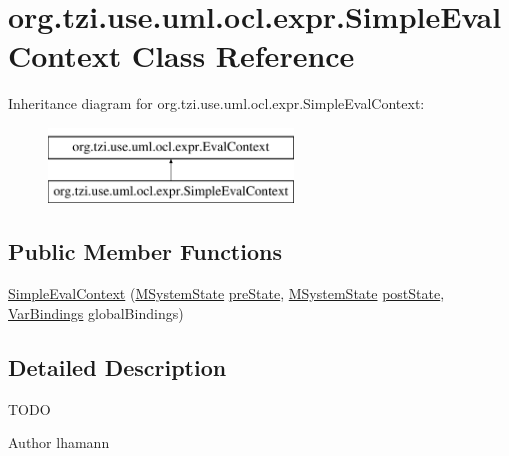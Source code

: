 \hypertarget{classorg_1_1tzi_1_1use_1_1uml_1_1ocl_1_1expr_1_1_simple_eval_context}{\section{org.\-tzi.\-use.\-uml.\-ocl.\-expr.\-Simple\-Eval\-Context Class Reference}
\label{classorg_1_1tzi_1_1use_1_1uml_1_1ocl_1_1expr_1_1_simple_eval_context}
}
Inheritance diagram for org.\-tzi.\-use.\-uml.\-ocl.\-expr.\-Simple\-Eval\-Context\-:\begin{figure}[H]
\begin{center}
\leavevmode
\includegraphics[height=2.000000cm]{classorg_1_1tzi_1_1use_1_1uml_1_1ocl_1_1expr_1_1_simple_eval_context}
\end{center}
\end{figure}
\subsection*{Public Member Functions}
\begin{DoxyCompactItemize}
\item 
\hyperlink{classorg_1_1tzi_1_1use_1_1uml_1_1ocl_1_1expr_1_1_simple_eval_context_aedbca347052ed210102b2c48e0433a13}{Simple\-Eval\-Context} (\hyperlink{classorg_1_1tzi_1_1use_1_1uml_1_1sys_1_1_m_system_state}{M\-System\-State} \hyperlink{classorg_1_1tzi_1_1use_1_1uml_1_1ocl_1_1expr_1_1_eval_context_a6fb38133d57ae3d04bd314c3021b7f10}{pre\-State}, \hyperlink{classorg_1_1tzi_1_1use_1_1uml_1_1sys_1_1_m_system_state}{M\-System\-State} \hyperlink{classorg_1_1tzi_1_1use_1_1uml_1_1ocl_1_1expr_1_1_eval_context_ac2aea50bc5b2d92d095ca6bd1f6207f5}{post\-State}, \hyperlink{classorg_1_1tzi_1_1use_1_1uml_1_1ocl_1_1value_1_1_var_bindings}{Var\-Bindings} global\-Bindings)
\end{DoxyCompactItemize}


\subsection{Detailed Description}
T\-O\-D\-O \begin{DoxyAuthor}{Author}
lhamann 
\end{DoxyAuthor}


